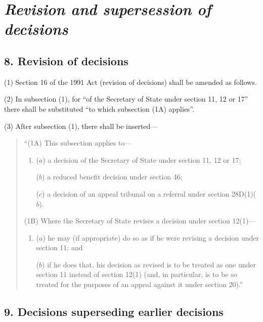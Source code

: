 \documentclass[12pt,a4paper]{article}
\begin{document}

\section{\itshape Revision and supersession of decisions}

\subsection{8. Revision of decisions}

(1) Section 16 of the 1991 Act (revision of decisions) shall be amended as follows.

(2) In subsection (1), for “of the Secretary of State under section 11, 12 or 17” there shall be substituted “to which subsection (1A)  applies”.

(3) After subsection (1), there shall be inserted—
\begin{quotation}
“(1A) This subsection applies to—
\begin{enumerate}\item[]
($a$) a decision of the Secretary of State under section 11, 12 or 17;

($b$) a reduced benefit decision under section 46;

($c$) a decision of an appeal tribunal on a referral under section 28D(1)($b$).
\end{enumerate}

(1B) Where the Secretary of State revises a decision under section 12(1)—
\begin{enumerate}\item[]
($a$) he may (if appropriate) do so as if he were revising a decision under section 11; and

($b$) if he does that, his decision as revised is to be treated as one under section 11 instead of section 12(1)  (and, in particular, is to be so treated for the purposes of an appeal against it under section 20).”
\end{enumerate}
\end{quotation}


\subsection{9. Decisions superseding earlier decisions}
\end{document}
